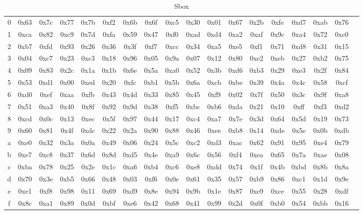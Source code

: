 \begin{table}[h]
{\begin{tabular}{c | c c c c c c c c c c c c c c c c c}
    0 & 0x63 & 0x7c & 0x77 & 0x7b & 0xf2 & 0x6b & 0x6f & 0xc5 & 0x30 & 0x01 & 0x67 & 0x2b & 0xfe & 0xd7 & 0xab & 0x76 \\  1 &  0xca & 0x82 & 0xc9 & 0x7d & 0xfa & 0x59 & 0x47 & 0xf0 & 0xad & 0xd4 & 0xa2 & 0xaf & 0x9c & 0xa4 & 0x72 & 0xc0 \\ 2 &  0xb7 & 0xfd & 0x93 & 0x26 & 0x36 & 0x3f & 0xf7 & 0xcc & 0x34 & 0xa5 & 0xe5 & 0xf1 & 0x71 & 0xd8 & 0x31 & 0x15 \\ 3 & 0x04 & 0xc7 & 0x23 & 0xc3 & 0x18 & 0x96 & 0x05 & 0x9a & 0x07 & 0x12 & 0x80 & 0xe2 & 0xeb & 0x27 & 0xb2 & 0x75 \\ 4 & 0x09 & 0x83 & 0x2c & 0x1a & 0x1b & 0x6e & 0x5a & 0xa0 & 0x52 & 0x3b & 0xd6 & 0xb3 & 0x29 & 0xe3 & 0x2f & 0x84 \\ 5 & 0x53 & 0xd1 & 0x00 & 0xed & 0x20 & 0xfc & 0xb1 & 0x5b & 0x6a & 0xcb & 0xbe & 0x39 & 0x4a & 0x4c & 0x58 & 0xcf \\ 6 & 0xd0 & 0xef & 0xaa & 0xfb & 0x43 & 0x4d & 0x33 & 0x85 & 0x45 & 0xf9 & 0x02 & 0x7f & 0x50 & 0x3c & 0x9f & 0xa8 \\ 7 & 0x51 & 0xa3 & 0x40 & 0x8f & 0x92 & 0x9d & 0x38 & 0xf5 & 0xbc & 0xb6 & 0xda & 0x21 & 0x10 & 0xff & 0xf3 & 0xd2 \\ 8 & 0xcd & 0x0c & 0x13 & 0xec & 0x5f & 0x97 & 0x44 & 0x17 & 0xc4 & 0xa7 & 0x7e & 0x3d & 0x64 & 0x5d & 0x19 & 0x73 \\ 9 & 0x60 & 0x81 & 0x4f & 0xdc & 0x22 & 0x2a & 0x90 & 0x88 & 0x46 & 0xee & 0xb8 & 0x14 & 0xde & 0x5e & 0x0b & 0xdb \\ a & 0xe0 & 0x32 & 0x3a & 0x0a & 0x49 & 0x06 & 0x24 & 0x5c & 0xc2 & 0xd3 & 0xac & 0x62 & 0x91 & 0x95 & 0xe4 & 0x79 \\ b & 0xe7 & 0xc8 & 0x37 & 0x6d & 0x8d & 0xd5 & 0x4e & 0xa9 & 0x6c & 0x56 & 0xf4 & 0xea & 0x65 & 0x7a & 0xae & 0x08 \\ c & 0xba & 0x78 & 0x25 & 0x2e & 0x1c & 0xa6 & 0xb4 & 0xc6 & 0xe8 & 0xdd & 0x74 & 0x1f & 0x4b & 0xbd & 0x8b & 0x8a \\ d & 0x70 & 0x3e & 0xb5 & 0x66 & 0x48 & 0x03 & 0xf6 & 0x0e & 0x61 & 0x35 & 0x57 & 0xb9 & 0x86 & 0xc1 & 0x1d & 0x9e \\ e & 0xe1 & 0xf8 & 0x98 & 0x11 & 0x69 & 0xd9 & 0x8e & 0x94 & 0x9b & 0x1e & 0x87 & 0xe9 & 0xce & 0x55 & 0x28 & 0xdf \\ f & 0x8c & 0xa1 & 0x89 & 0x0d & 0xbf & 0xe6 & 0x42 & 0x68 & 0x41 & 0x99 & 0x2d & 0x0f & 0xb0 & 0x54 & 0xbb & 0x16 \\
  \end{tabular}
  }
  \caption{Sbox}
  \label{sbox}
\end{table}
